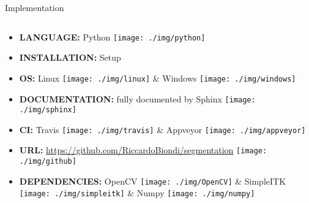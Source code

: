 \documentclass{standalone}
\begin{document}
	\begin{frame}{Implementation}
		\begin{block}{}
			\begin{columns}
				\begin{column}{.75\textwidth}
					\begin{itemize}
						\item \textbf{LANGUAGE:} \textsf{Python} \texttt{[image: ./img/python]}
						\item \textbf{INSTALLATION:} \textsf{Setup}
						\item \textbf{OS:} Linux \texttt{[image: ./img/linux]} \&
										   Windows \texttt{[image: ./img/windows]}
						\item \textbf{DOCUMENTATION:} fully documented by Sphinx \texttt{[image: ./img/sphinx]}
						\item \textbf{CI:} Travis \texttt{[image: ./img/travis]} \& Appveyor \texttt{[image: ./img/appveyor]}
						\item \textbf{URL:} \url{https://github.com/RiccardoBiondi/segmentation} \texttt{[image: ./img/github]}
						\item \textbf{DEPENDENCIES:} \textsf{OpenCV} \texttt{[image: ./img/OpenCV]} \&
								\textsf{SimpleITK} \texttt{[image: ./img/simpleitk]} \&
								\textsf{Numpy} \texttt{[image: ./img/numpy]}
					\end{itemize}
				\end{column}
			\end{columns}
		\end{block}
	\end{frame}
\end{document}
